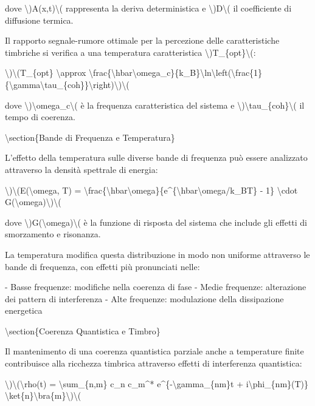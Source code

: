 \documentclass[a4paper,11pt]{article}
\begin{document}
dove \textbackslash{})A(x,t)\textbackslash{}( rappresenta la deriva deterministica e \textbackslash{})D\textbackslash{}( il coefficiente
di diffusione termica.

Il rapporto segnale-rumore ottimale per la percezione delle
caratteristiche timbriche si verifica a una temperatura caratteristica
\textbackslash{})T\_\{opt\}\textbackslash{}(:

\textbackslash{})\textbackslash{}(T\_\{opt\} \textbackslash{}approx \textbackslash{}frac\{\textbackslash{}hbar\textbackslash{}omega\_c\}\{k\_B\}\textbackslash{}ln\textbackslash{}left(\textbackslash{}frac\{1\}\{\textbackslash{}gamma\textbackslash{}tau\_\{coh\}\}\textbackslash{}right)\textbackslash{})\textbackslash{}(

dove \textbackslash{})\textbackslash{}omega\_c\textbackslash{}( \`e la frequenza caratteristica del sistema e \textbackslash{})\textbackslash{}tau\_\{coh\}\textbackslash{}(
il tempo di coerenza.

\textbackslash{}section\{Bande di Frequenza e Temperatura\}

L'effetto della temperatura sulle diverse bande di frequenza pu\`o essere
analizzato attraverso la densit\`a spettrale di energia:

\textbackslash{})\textbackslash{}(E(\textbackslash{}omega, T) = \textbackslash{}frac\{\textbackslash{}hbar\textbackslash{}omega\}\{e\textasciicircum{}\{\textbackslash{}hbar\textbackslash{}omega/k\_BT\} - 1\} \textbackslash{}cdot G(\textbackslash{}omega)\textbackslash{})\textbackslash{}(

dove \textbackslash{})G(\textbackslash{}omega)\textbackslash{}( \`e la funzione di risposta del sistema che include gli
effetti di smorzamento e risonanza.

La temperatura modifica questa distribuzione in modo non uniforme
attraverso le bande di frequenza, con effetti pi\`u pronunciati nelle:

- Basse frequenze: modifiche nella coerenza di fase
- Medie frequenze: alterazione dei pattern di interferenza
- Alte frequenze: modulazione della dissipazione energetica

\textbackslash{}section\{Coerenza Quantistica e Timbro\}

Il mantenimento di una coerenza quantistica parziale anche a temperature
finite contribuisce alla ricchezza timbrica attraverso effetti di
interferenza quantistica:

\textbackslash{})\textbackslash{}(\textbackslash{}rho(t) = \textbackslash{}sum\_\{n,m\} c\_n c\_m\textasciicircum{}* e\textasciicircum{}\{-\textbackslash{}gamma\_\{nm\}t + i\textbackslash{}phi\_\{nm\}(T)\} \textbackslash{}ket\{n\}\textbackslash{}bra\{m\}\textbackslash{})\textbackslash{}(
\end{document}
